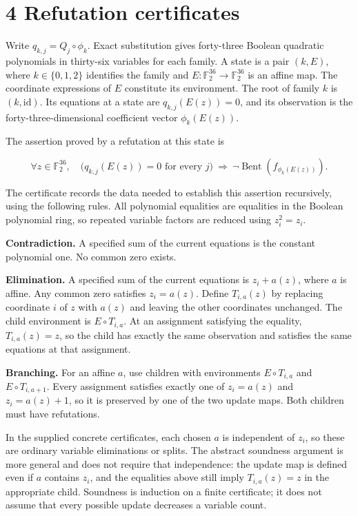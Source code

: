 \documentclass[pdflatex,sn-mathphys-num]{sn-jnl}
\begin{document}
\section*{4 Refutation certificates}

Write $q_{k,j}=Q_j\circ\phi_k$. Exact substitution gives forty-three Boolean quadratic polynomials in thirty-six variables for each family. A state is a pair $(k,E)$, where $k\in\{0,1,2\}$ identifies the family and $E:\mathbb F_2^{36}\to\mathbb F_2^{36}$ is an affine map. The coordinate expressions of $E$ constitute its environment. The root of family $k$ is $(k,\mathrm{id})$. Its equations at a state are $q_{k,j}(E(z))=0$, and its observation is the forty-three-dimensional coefficient vector $\phi_k(E(z))$.

The assertion proved by a refutation at this state is

\[
\forall z\in\mathbb F_2^{36},\quad
\bigl(q_{k,j}(E(z))=0\text{ for every }j\bigr)
\ \Longrightarrow\ \neg\operatorname{Bent}(f_{\phi_k(E(z))}).
\]

The certificate records the data needed to establish this assertion recursively, using the following rules. All polynomial equalities are equalities in the Boolean polynomial ring, so repeated variable factors are reduced using $z_i^2=z_i$.

\textbf{Contradiction.} A specified sum of the current equations is the constant polynomial one. No common zero exists.

\textbf{Elimination.} A specified sum of the current equations is $z_i+a(z)$, where $a$ is affine. Any common zero satisfies $z_i=a(z)$. Define $T_{i,a}(z)$ by replacing coordinate $i$ of $z$ with $a(z)$ and leaving the other coordinates unchanged. The child environment is $E\circ T_{i,a}$. At an assignment satisfying the equality, $T_{i,a}(z)=z$, so the child has exactly the same observation and satisfies the same equations at that assignment.

\textbf{Branching.} For an affine $a$, use children with environments $E\circ T_{i,a}$ and $E\circ T_{i,a+1}$. Every assignment satisfies exactly one of $z_i=a(z)$ and $z_i=a(z)+1$, so it is preserved by one of the two update maps. Both children must have refutations.

In the supplied concrete certificates, each chosen $a$ is independent of $z_i$, so these are ordinary variable eliminations or splits. The abstract soundness argument is more general and does not require that independence: the update map is defined even if $a$ contains $z_i$, and the equalities above still imply $T_{i,a}(z)=z$ in the appropriate child. Soundness is induction on a finite certificate; it does not assume that every possible update decreases a variable count.
\end{document}
